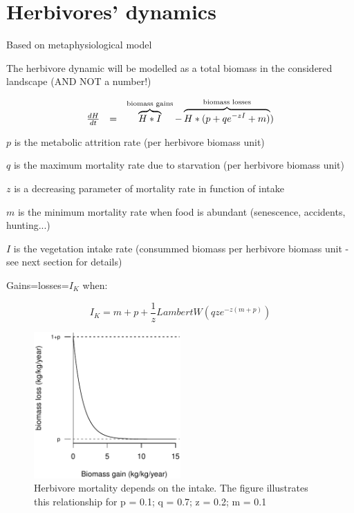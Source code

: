 
\newpage
\section{Herbivores' dynamics}

Based on metaphysiological model \cite{Owen-Smith2002}

The herbivore dynamic will be modelled as a total biomass in the considered
landscape (AND NOT a number!)

\[
\left.
\begin{array}{r c l}{}

\frac{dH}{dt} &=& 
\overbrace{H*I}^\text{biomass gains} - \overbrace{H*(p+qe^{-zI}+m)}^\text{biomass losses})

\end{array}
\right.
\]


\vspace{1em}

$p$ is the metabolic attrition rate (per herbivore biomass unit)

$q$ is the maximum mortality rate due to starvation (per herbivore biomass unit)

$z$ is a decreasing parameter of mortality rate in function of intake

$m$ is the minimum mortality rate when food is abundant (senescence, accidents, hunting...)

$I$ is the vegetation intake rate (consummed biomass per herbivore biomass unit - see next section for details)

\vspace{1em}

Gains=losses=$I_K$ when:

\[
I_K = m + p + \frac{1}{z}LambertW(qze^{-z(m+p)})
\]


\begin{figure}
\centering
   \includegraphics[width=0.5\textwidth]{../graphs/herbivore_mortality.pdf}

   \caption{Herbivore mortality depends on the intake. The figure illustrates
   this relationship for p = 0.1; q = 0.7; z = 0.2; m = 0.1}

\label{herbiMort} 
\end{figure}


